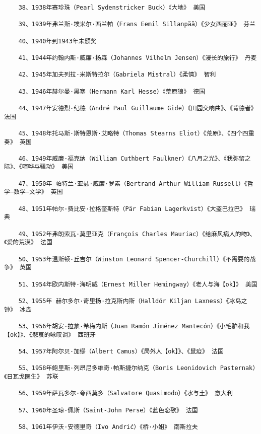 \documentclass[UTF8]{../RepresentationUniverse}
\begin{document}
\begin{lstlisting}
    38、1938年赛珍珠（Pearl Sydenstricker Buck）《大地》 美国
    
    39、1939年弗兰斯·埃米尔·西兰帕（Frans Eemil Sillanpää）《少女西丽亚》 芬兰
    
    40、1940年到1943年未颁奖
    
    41、1944年约翰内斯·威廉·扬森（Johannes Vilhelm Jensen）《漫长的旅行》 丹麦
    
    42、1945年加夫列拉·米斯特拉尔（Gabriela Mistral）《柔情》 智利
    
    43、1946年赫尔曼·黑塞（Hermann Karl Hesse）《荒原狼》 德国
    
    44、1947年安德烈·纪德（André Paul Guillaume Gide）《田园交响曲》、《背德者》 法国
    
    45、1948年托马斯·斯特恩斯·艾略特（Thomas Stearns Eliot）《荒原》、《四个四重奏》 英国
    
    46、1949年威廉·福克纳（William Cuthbert Faulkner）《八月之光》、《我弥留之际》、《喧哗与骚动》 美国
    
    47、1950年 帕特兰·亚瑟·威廉·罗素（Bertrand Arthur William Russell）《哲学—数学—文学》 英国
    
    48、1951年帕尔·费比安·拉格奎斯特（Pär Fabian Lagerkvist）《大盗巴拉巴》 瑞典
    
    49、1952年弗朗索瓦·莫里亚克（François Charles Mauriac）《给麻风病人的吻》、《爱的荒漠》 法国
    
    50、1953年温斯顿·丘吉尔（Winston Leonard Spencer-Churchill）《不需要的战争》 英国
    
    51、1954年欧内斯特·海明威（Ernest Miller Hemingway）《老人与海【ok】》 美国
    
    52、1955年 赫尔多尔·奇里扬·拉克斯内斯（Halldór Kiljan Laxness）《冰岛之钟》 冰岛
    
    53、1956年胡安·拉蒙·希梅内斯（Juan Ramón Jiménez Mantecón）《小毛驴和我【ok】》、《悲哀的咏叹调》 西班牙
    
    54、1957年阿尔贝·加缪（Albert Camus）《局外人【ok】》、《鼠疫》 法国
    
    55、1958年鲍里斯·列昂尼多维奇·帕斯捷尔纳克（Boris Leonidovich Pasternak）《日瓦戈医生》 苏联
    
    56、1959年萨瓦多尔·夸西莫多（Salvatore Quasimodo）《水与土》 意大利
    
    57、1960年圣琼·佩斯（Saint-John Perse）《蓝色恋歌》 法国
    
    58、1961年伊沃·安德里奇（Ivo Andrić）《桥·小姐》 南斯拉夫
    

\end{lstlisting}
\end{document}
